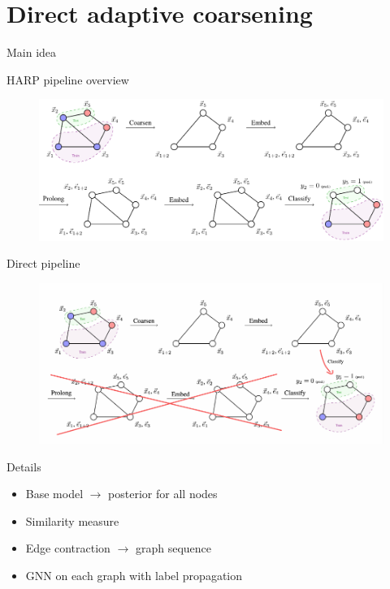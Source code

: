 \documentclass[10pt, aspectratio=169]{beamer}
\begin{document}
\section{Direct adaptive coarsening}

\begin{frame}{Main idea}
	\centering
    
\end{frame}

\begin{frame}{HARP pipeline overview}
	\begin{figure}
		\centering
		\includegraphics[width=\textwidth]{images/harp-overview/harp-overview.pdf}
	\end{figure}
\end{frame}

\begin{frame}{Direct pipeline}
	\begin{figure}
		\centering
		\includegraphics[width=\textwidth]{images/harp-overview-edit.pdf}
	\end{figure}
\end{frame}

\begin{frame}{Details}
    \begin{itemize}
        \item Base model $\to$ posterior for all nodes
        \item Similarity measure
        \item Edge contraction $\to$ graph sequence
        \item GNN on each graph with label propagation
    \end{itemize}
    \vspace{1cm}
	\centering
    \scalebox{0.75}{}
\end{frame}
\end{document}

